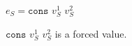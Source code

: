 \begin{case}
$e_{S}=\mathtt{cons}$ $v_{S}^{1}$ $v_{S}^{2}$

$\mathtt{cons}$ $v_{S}^{1}$ $v_{S}^{2}$ is a forced value.
\end{case}
